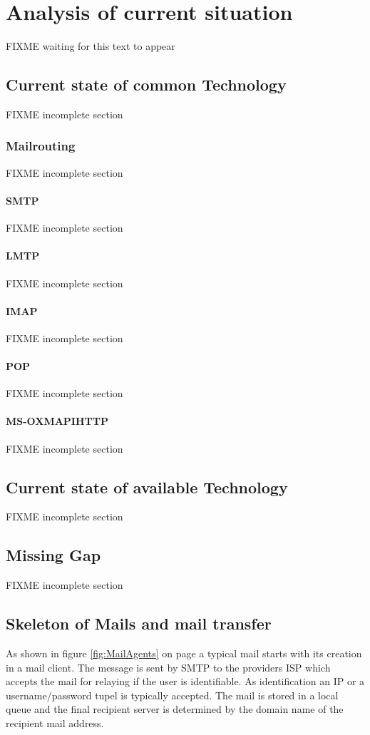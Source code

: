 \chapter{Analysis of current situation}\label{chap:analysis}
FIXME waiting for this text to appear

\section{Current state of common Technology}
FIXME incomplete section

\subsection{Mailrouting}
FIXME incomplete section

\subsubsection{SMTP}
FIXME incomplete section

\subsubsection{LMTP}
FIXME incomplete section

\subsubsection{IMAP}
FIXME incomplete section

\subsubsection{POP}
FIXME incomplete section

\subsubsection{MS-OXMAPIHTTP}
FIXME incomplete section

\section{Current state of available Technology}
FIXME incomplete section

\section{Missing Gap}
FIXME incomplete section

\section{Skeleton of Mails and mail transfer}\label{sec:mailTransportSkeleton}
As shown in figure \ref{fig:MailAgents} on page \pageref{fig:MailAgents} a typical mail starts with its creation in a mail client. The message is sent by SMTP to the providers ISP which accepts the mail for relaying if the user is identifiable. As identification an IP or a username/password tupel is typically accepted. The mail is stored in a local queue and the final recipient server is determined by the domain name of the recipient mail address.\par

